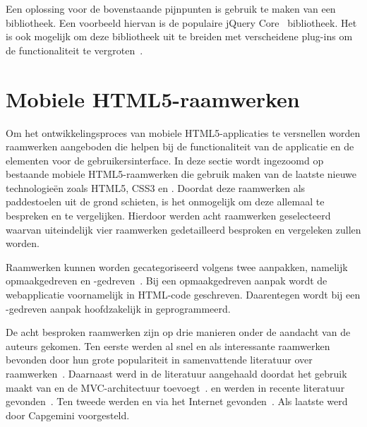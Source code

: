 Een oplossing voor de bovenstaande pijnpunten is gebruik te maken van een bibliotheek. 
Een voorbeeld hiervan is de populaire jQuery Core~\cite{JQuery2013a} bibliotheek. 
Het is ook mogelijk om deze bibliotheek uit te breiden met verscheidene plug-ins om de functionaliteit te vergroten~\cite{McFarland2011}.


\section{Mobiele HTML5-raamwerken}
\label{sec:mobiele-html5-raamwerken}

Om het ontwikkelingsproces van mobiele HTML5-applicaties te versnellen worden raamwerken aangeboden die helpen bij de functionaliteit van de applicatie en de elementen voor de gebruikersinterface.
In deze sectie wordt ingezoomd op bestaande mobiele HTML5-raamwerken die gebruik maken van de laatste nieuwe technologieën zoals HTML5, CSS3 en \js{}.
Doordat deze raamwerken als paddestoelen uit de grond schieten, is het onmogelijk om deze allemaal te bespreken en te vergelijken.
Hierdoor werden acht raamwerken geselecteerd waarvan uiteindelijk vier raamwerken gedetailleerd besproken en vergeleken zullen worden.

Raamwerken kunnen worden gecategoriseerd volgens twee aanpakken, namelijk opmaakgedreven en \js{}-gedreven~\cite{Oeflman2011}.
Bij een opmaakgedreven aanpak wordt de webapplicatie voornamelijk in HTML-code geschreven. 
Daarentegen wordt bij een \js{}-gedreven aanpak hoofdzakelijk in \js{} geprogrammeerd.

De acht besproken raamwerken zijn op drie manieren onder de aandacht van de auteurs gekomen.
Ten eerste werden al snel \jqm{} en \st{} als interessante raamwerken bevonden door hun grote populariteit in samenvattende literatuur over raamwerken~\cite{Firtman2013,Hales2012,Oeflman2011,David2011}.
Daarnaast werd \tmp{} in de literatuur aangehaald doordat het gebruik maakt van \jqm{} en de MVC-architectuur toevoegt~\cite{Firtman2013}.
\lungo{} en \jqt{} werden in recente literatuur gevonden~\cite{Firtman2013,Hales2012}.
Ten tweede werden \kendo{} en \moobile{} via het Internet gevonden~\cite{Bristowe2012}.
Als laatste werd \davinci{} door Capgemini voorgesteld.


